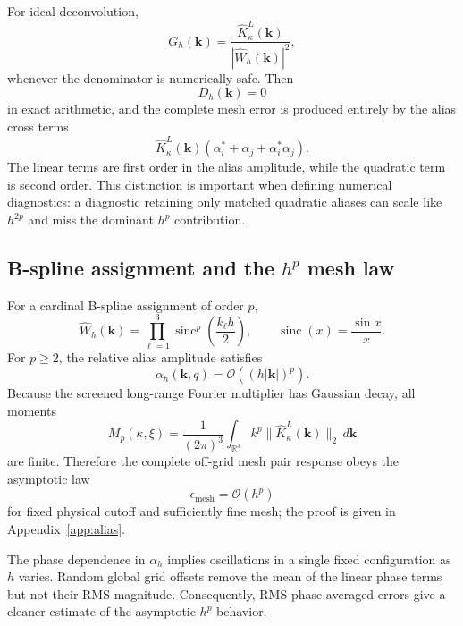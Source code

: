 \documentclass[11pt]{article}
\theoremstyle{plain}
\newcommand{\kk}{\bm k}
\DeclareRobustCommand{\_}{\textunderscore\allowbreak}
\begin{document}
For ideal deconvolution,
\begin{equation}
G_h(\kk)
=
\frac{\widehat K_\kappa^L(\kk)}
{|\widehat W_h(\kk)|^2},
\end{equation}
whenever the denominator is numerically safe. Then
\begin{equation}
D_h(\kk)=0
\end{equation}
in exact arithmetic, and the complete mesh error is produced entirely by
the alias cross terms
\begin{equation}
\widehat K_\kappa^L(\kk)
\left(
\alpha_i^*+\alpha_j+\alpha_i^*\alpha_j
\right).
\end{equation}
The linear terms are first order in the alias amplitude, while the quadratic
term is second order. This distinction is important when defining
numerical diagnostics: a diagnostic retaining only matched quadratic
aliases can scale like $h^{2p}$ and miss the dominant $h^p$ contribution.

\subsection{B-spline assignment and the \texorpdfstring{$h^p$}{h\textasciicircum p} mesh law}

For a cardinal B-spline assignment of order $p$,
\begin{equation}
\widehat W_h(\kk)
=
\prod_{\ell=1}^3
\operatorname{sinc}^p
\left(\frac{k_\ell h}{2}\right),
\qquad
\operatorname{sinc}(x)=\frac{\sin x}{x}.
\end{equation}
For $p\ge2$, the relative alias amplitude satisfies
\begin{equation}
\alpha_h(\kk,q)
=
\mathcal{O}\!\left((h|\kk|)^p\right).
\end{equation}
Because the screened long-range Fourier multiplier has Gaussian decay,
all moments
\begin{equation}
M_p(\kappa,\xi)
=
\frac{1}{(2\pi)^3}
\int_{\mathbb R^3}
k^p
\|\widehat K_\kappa^L(\kk)\|_2
\,d\kk
\end{equation}
are finite. Therefore the complete off-grid mesh pair response obeys the
asymptotic law
\begin{equation}
\label{eq:mesh-law}
\epsilon_{\mathrm{mesh}}
=
\mathcal{O}(h^p)
\end{equation}
for fixed physical cutoff and sufficiently fine mesh; the proof is given in
Appendix~\ref{app:alias}.

The phase dependence in $\alpha_h$ implies oscillations in a single fixed
configuration as $h$ varies. Random global grid offsets remove the mean of
the linear phase terms but not their RMS magnitude. Consequently, RMS
phase-averaged errors give a cleaner estimate of the asymptotic $h^p$
behavior.
\end{document}

